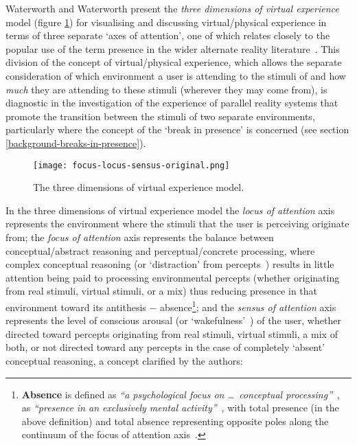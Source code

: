 \newcommand{\absencefootnote}{\footnote{\textbf{Absence} is defined as \textit{``a psychological focus on \ldots\ conceptual processing''}~\cite{Waterworth2001}, as \textit{``presence in an exclusively mental activity''}~\cite{Giuseppe2014}, with total presence (in the above definition) and total absence representing opposite poles along the continuum of the focus of attention axis~\cite{Mantovani2010}.}}

Waterworth and Waterworth present the \textit{three dimensions of virtual experience} model (figure \ref{focus-locus-sensus-original}) for visualising and discussing virtual/physical experience in terms of three separate `axes of attention', one of which relates closely to the popular use of the term presence in the wider alternate reality literature~\cite{Waterworth2001}. This division of the concept of virtual/physical experience, which allows the separate consideration of which environment a user is attending to the stimuli of and how \textit{much} they are attending to these stimuli (wherever they may come from), is diagnostic in the investigation of the experience of parallel reality systems that promote the transition between the stimuli of two separate environments, particularly where the concept of the `break in presence' is concerned (see section \ref{background-breaks-in-presence}).

\begin{figure}[h]
	\begin{center}
		\texttt{[image: focus-locus-sensus-original.png]}
		\caption{The three dimensions of virtual experience model.}
		\label{focus-locus-sensus-original}
	\end{center}	
\end{figure}

In the three dimensions of virtual experience model the \textit{locus of attention} axis represents the environment where the stimuli that the user is perceiving originate from; the \textit{focus of attention} axis represents the balance between conceptual/abstract reasoning and perceptual/concrete processing, where complex conceptual reasoning (or `distraction' from percepts~\cite{Chalmers2014}) results in little attention being paid to processing environmental percepts (whether originating from real stimuli, virtual stimuli, or a mix) thus reducing presence\presencefootnote{} in that environment toward its antithesis $-$ absence\absencefootnote{}; and the \textit{sensus of attention} axis represents the level of conscious arousal (or `wakefulness'~\cite{Laureys2009}) of the user, whether directed toward percepts originating from real stimuli, virtual stimuli, a mix of both, or not directed toward any percepts in the case of completely `absent' conceptual reasoning, a concept clarified by the authors:

